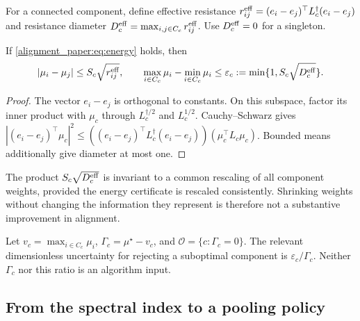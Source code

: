 For a connected component, define effective resistance
$r_{ij}^{\rm eff}=(e_i-e_j)^\top L_c^\dagger(e_i-e_j)$ and resistance diameter
$D_c^{\rm eff}=\max_{i,j\in C_c}r_{ij}^{\rm eff}$. Use $D_c^{\rm eff}=0$ for a singleton.

\begin{lemma}
If \eqref{alignment_paper:eq:energy} holds, then
\begin{equation}
 |\mu_i-\mu_j|\le S_c\sqrt{r_{ij}^{\rm eff}},\qquad
 \max_{i\in C_c}\mu_i-\min_{i\in C_c}\mu_i
 \le\varepsilon_c:=\min\{1,S_c\sqrt{D_c^{\rm eff}}\}.
 \label{alignment_paper:eq:width}
\end{equation}
\label{alignment_paper:lem:resistance}
\end{lemma}
\begin{proof}
The vector $e_i-e_j$ is orthogonal to constants. On this subspace, factor its inner product with $\mu_c$ through $L_c^{\dagger/2}$ and $L_c^{1/2}$. Cauchy--Schwarz gives
$|(e_i-e_j)^\top\mu_c|^2\le
((e_i-e_j)^\top L_c^\dagger(e_i-e_j))(\mu_c^\top L_c\mu_c)$.
Bounded means additionally give diameter at most one.
\end{proof}
The product $S_c\sqrt{D_c^{\rm eff}}$ is invariant to a common rescaling of all component weights, provided the energy certificate is rescaled consistently. Shrinking weights without changing the information they represent is therefore not a substantive improvement in alignment.

Let $v_c=\max_{i\in C_c}\mu_i$, $\Gamma_c=\mu^\star-v_c$, and
$\mathcal O=\{c:\Gamma_c=0\}$. The relevant dimensionless uncertainty for rejecting a suboptimal component is $\varepsilon_c/\Gamma_c$. Neither $\Gamma_c$ nor this ratio is an algorithm input.

\subsection{From the spectral index to a pooling policy}
